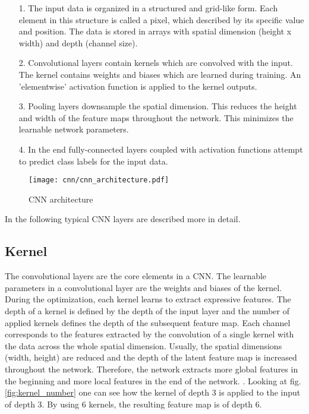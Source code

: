 \begin{itemize}
    \item [1.] The input data is organized in a structured and grid-like form. Each element in this structure is called a pixel, which described by its specific value and position. The data is stored in arrays with spatial dimension (height x width) and depth (channel size).
    
    \item [2.] Convolutional layers contain kernels which are convolved with the input. The kernel contains weights and biases which are learned during training. An 'elementwise' activation function is applied to the kernel outputs.
    
    \item [3.]  Pooling layers downsample the spatial dimension. This reduces the height and width of the feature maps throughout the network. This minimizes the learnable network parameters.
    
    \item [4.] In the end fully-connected layers coupled with activation functions attempt to predict class labels for the input data.
\end{itemize}

\begin{figure}[H]
  \centering
  \texttt{[image: cnn/cnn\_architecture.pdf]}
  \caption {CNN architecture \cite{OShea2015}}
  \label{fig:CNN_overview}
\end{figure}

In the following typical CNN layers are described more in detail. 

\subsection{Kernel}
The convolutional layers are the core elements in a CNN. The learnable parameters in a convolutional layer are the weights and biases of the kernel. During the optimization, each kernel learns to extract expressive features. The depth of a kernel is defined by the depth of the input layer and the number of applied kernels defines the depth of the subsequent feature map. Each channel corresponds to the features extracted by the convolution of a single kernel with the data across the whole spatial dimension. Usually, the spatial dimensions (width, height) are reduced and the depth of the latent feature map is increased throughout the network. Therefore, the network extracts more global features in the beginning and more local features in the end of the network.  \cite{OShea2015}. Looking at fig. \ref{fig:kernel_number} one can see how the kernel of depth 3 is applied to the input of depth 3. By using 6 kernels, the resulting feature map is of depth 6.

